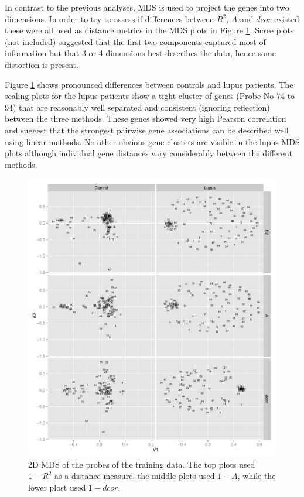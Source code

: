 \documentclass[a4paper, 12pt]{report}
\begin{document}
In contrast to the previous analyses, MDS is used to project the genes into two dimensions. In order to try to assess if differences  between $R^2$, $A$ and $dcor$ existed these were all used as distance metrics in the MDS plots in Figure \ref{F:MDS}. Scree plots (not included) suggested that the first two components captured most of information but that 3 or 4 dimensions best describes the data, hence some distortion is present. 

Figure \ref{F:MDS} shows pronounced differences between controls and lupus patients. The scaling plots for the lupus patients show a tight cluster of genes (Probe No 74 to 94) that are reasonably well separated and consistent (ignoring reflection) between the three methods. These genes showed very high Pearson correlation and suggest that the strongest pairwise gene associations can be described well using linear methods. No other obvious gene clusters are visible in the lupus MDS plots although individual gene distances vary considerably between the different methods. 


\begin{figure}[H]
\begin{center}
\includegraphics[width=\textwidth]{MDS.pdf}
\caption{2D MDS of the probes of the training data. The top plots used $1-R^2$ as a distance measure, the middle plots used $1 -  A$,  while the lower plost used $1 - dcor$.}
\label{F:MDS}
\end{center}
\end{figure}
\end{document}
